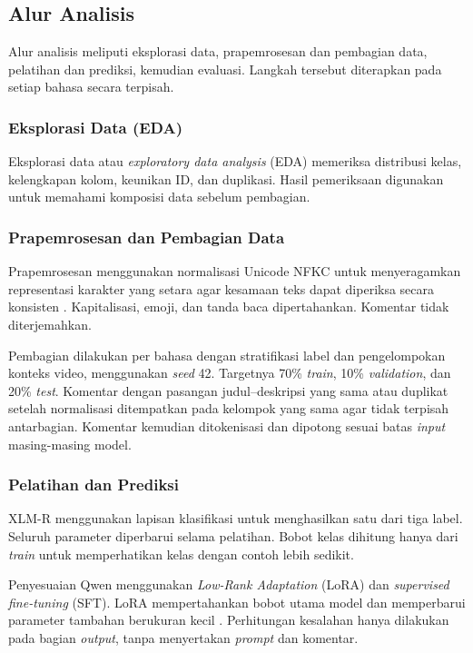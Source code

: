 \documentclass[11pt]{article}
\begin{document}
\subsection{Alur Analisis}
Alur analisis meliputi eksplorasi data, prapemrosesan dan pembagian data, pelatihan dan prediksi, kemudian evaluasi. Langkah tersebut diterapkan pada setiap bahasa secara terpisah.

\subsubsection{Eksplorasi Data (EDA)}
Eksplorasi data atau \textit{exploratory data analysis} (EDA) memeriksa distribusi kelas, kelengkapan kolom, keunikan ID, dan duplikasi. Hasil pemeriksaan digunakan untuk memahami komposisi data sebelum pembagian.

\subsubsection{Prapemrosesan dan Pembagian Data}
Prapemrosesan menggunakan normalisasi Unicode NFKC untuk menyeragamkan representasi karakter yang setara agar kesamaan teks dapat diperiksa secara konsisten \citep{unicode-consortium-2026-normalization}. Kapitalisasi, emoji, dan tanda baca dipertahankan. Komentar tidak diterjemahkan.

Pembagian dilakukan per bahasa dengan stratifikasi label dan pengelompokan konteks video, menggunakan \textit{seed} 42. Targetnya 70\% \textit{train}, 10\% \textit{validation}, dan 20\% \textit{test}. Komentar dengan pasangan judul--deskripsi yang sama atau duplikat setelah normalisasi ditempatkan pada kelompok yang sama agar tidak terpisah antarbagian. Komentar kemudian ditokenisasi dan dipotong sesuai batas \textit{input} masing-masing model.

\subsubsection{Pelatihan dan Prediksi}
XLM-R menggunakan lapisan klasifikasi untuk menghasilkan satu dari tiga label. Seluruh parameter diperbarui selama pelatihan. Bobot kelas dihitung hanya dari \textit{train} untuk memperhatikan kelas dengan contoh lebih sedikit.

Penyesuaian Qwen menggunakan \textit{Low-Rank Adaptation} (LoRA) dan \textit{supervised fine-tuning} (SFT). LoRA mempertahankan bobot utama model dan memperbarui parameter tambahan berukuran kecil \citep{hu-etal-2021-lora}. Perhitungan kesalahan hanya dilakukan pada bagian \textit{output}, tanpa menyertakan \textit{prompt} dan komentar.
\end{document}
